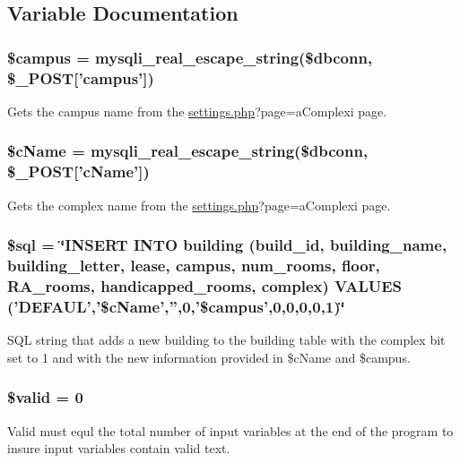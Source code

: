 \subsection{\-Variable \-Documentation}
\hypertarget{complexVal_8php_a6f0655994f3941d6ab50f681032f899b}{
\subsubsection[{\$campus}]{\setlength{\rightskip}{0pt plus 5cm}\$campus = mysqli\-\_\-real\-\_\-escape\-\_\-string(\$dbconn, \$\-\_\-\-P\-O\-S\-T\mbox{[}'campus'\mbox{]})}}\label{complexVal_8php_a6f0655994f3941d6ab50f681032f899b}
\-Gets the campus name from the \hyperlink{settings_8php}{settings.\-php}?page=a\-Complexi page. \hypertarget{complexVal_8php_a831a3fb4e8c6a458f33213df1511677c}{
\subsubsection[{\$c\-Name}]{\setlength{\rightskip}{0pt plus 5cm}\$c\-Name = mysqli\-\_\-real\-\_\-escape\-\_\-string(\$dbconn, \$\-\_\-\-P\-O\-S\-T\mbox{[}'c\-Name'\mbox{]})}}\label{complexVal_8php_a831a3fb4e8c6a458f33213df1511677c}
\-Gets the complex name from the \hyperlink{settings_8php}{settings.\-php}?page=a\-Complexi page. \hypertarget{complexVal_8php_a047170d6020a882807665812a27e2525}{
\subsubsection[{\$sql}]{\setlength{\rightskip}{0pt plus 5cm}\$sql = \char`\"{}\-I\-N\-S\-E\-R\-T \-I\-N\-T\-O building (build\-\_\-id, building\-\_\-name, building\-\_\-letter, lease, campus, num\-\_\-rooms, floor, \-R\-A\-\_\-rooms, handicapped\-\_\-rooms, complex) \-V\-A\-L\-U\-E\-S ('\-D\-E\-F\-A\-U\-L','\$c\-Name','',0,'\$campus',0,0,0,0,1)\char`\"{}}}\label{complexVal_8php_a047170d6020a882807665812a27e2525}
\-S\-Q\-L string that adds a new building to the building table with the complex bit set to 1 and with the new information provided in \$c\-Name and \$campus. \hypertarget{complexVal_8php_a0587674d27d00ef497e08e53ccf45bbb}{
\subsubsection[{\$valid}]{\setlength{\rightskip}{0pt plus 5cm}\$valid = 0}}\label{complexVal_8php_a0587674d27d00ef497e08e53ccf45bbb}
\-Valid must equl the total number of input variables at the end of the program to insure input variables contain valid text. 
